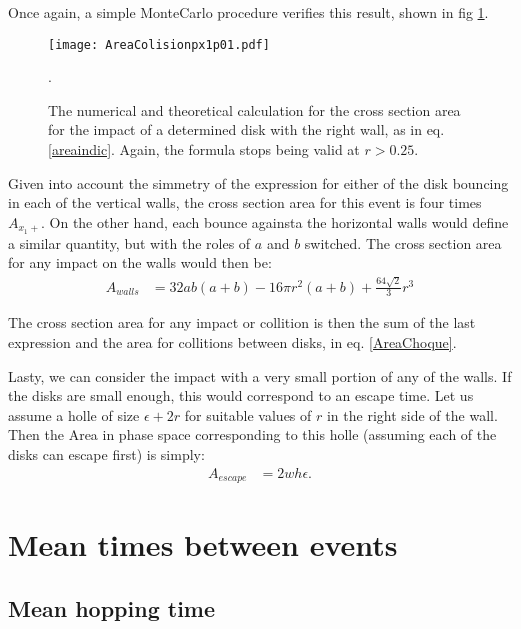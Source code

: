 \documentclass[a4paper,10pt, jcp, aps, preprint]{revtex4-1}
\begin{document}
Once again, a simple MonteCarlo procedure verifies this result,
shown in fig \ref{area1derecha}. 


\begin{figure}
\centering
\texttt{[image: AreaColisionpx1p01.pdf]}
\caption{The numerical and theoretical calculation for the cross section area
for the impact of a determined disk with the right wall, as in eq. \ref{areaindic}.
Again, the formula stops being valid at $r>0.25$. }
\label{area1derecha}.
\end{figure}


Given into account the simmetry of the expression for either of 
the disk bouncing in each of the vertical walls, the
cross section area for this event is four times $A_{x_1+}$. On
the other hand, each bounce againsta the horizontal walls would
define a similar quantity, but with the roles of $a$ and $b$ switched.
The cross section area for any impact on the walls would then be:
\begin{align}\label{areawalls}
 A_{walls} & = 32 a b (a+b)-16 \pi r^2 (a+b) +\frac{64\sqrt{2}}{3}r^3 
\end{align}

The cross section area for any impact or collition 
is then  the sum of the last expression
and the area for collitions between disks, in eq. \ref{AreaChoque}.


Lasty, we can consider the impact with a very small portion of any of the
walls. If the disks are small enough, this would correspond to an escape time. 
Let us assume a holle of size $\epsilon+2r$ for suitable values of $r$ in
the right side of the wall. Then the Area in phase space corresponding
to this holle (assuming each of the disks can escape first) is simply:
\begin{align}\label{escape}
 A_{escape} &= 2 w h \epsilon.
\end{align}



\section{Mean times between events}

\subsection{Mean hopping time}
\end{document}
